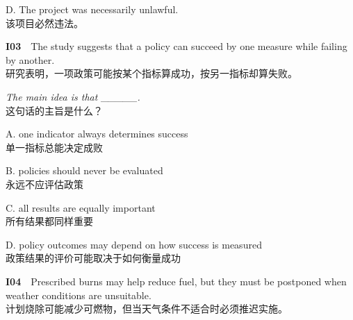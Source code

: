 \documentclass[a4paper,11pt,openany]{report}
\newcommand{\zhline}[1]{{\CJKsf\color{bodygrey}#1}}
\begin{document}
\begin{samepage}
D. The project was necessarily unlawful.\\
\zhline{该项目必然违法。}
\par\end{samepage}

\begin{samepage}
\textbf{I03}　The study suggests that a policy can succeed by one measure while failing by another.\\
\zhline{研究表明，一项政策可能按某个指标算成功，按另一指标却算失败。}
\par\end{samepage}

\begin{samepage}
\emph{The main idea is that \_\_\_\_\_.}\\
\zhline{这句话的主旨是什么？}
\par\end{samepage}

\begin{samepage}
A. one indicator always determines success\\
\zhline{单一指标总能决定成败}
\par\end{samepage}

\begin{samepage}
B. policies should never be evaluated\\
\zhline{永远不应评估政策}
\par\end{samepage}

\begin{samepage}
C. all results are equally important\\
\zhline{所有结果都同样重要}
\par\end{samepage}

\begin{samepage}
D. policy outcomes may depend on how success is measured\\
\zhline{政策结果的评价可能取决于如何衡量成功}
\par\end{samepage}

\begin{samepage}
\textbf{I04}　Prescribed burns may help reduce fuel, but they must be postponed when weather conditions are unsuitable.\\
\zhline{计划烧除可能减少可燃物，但当天气条件不适合时必须推迟实施。}
\par\end{samepage}
\end{document}
